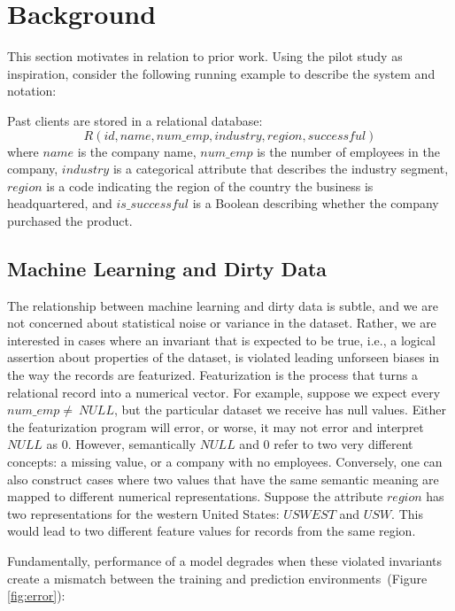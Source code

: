 \section{Background}
This section motivates \sys in relation to prior work.
Using the pilot study as inspiration, consider the following running example to describe the system and notation:

\begin{example}\sloppy\label{ex:lead}
 Past clients are stored in a relational database:
\[
R(id, name, num\_emp, industry, region, successful)
\]
where $name$ is the company name, $num\_emp$ is the number of employees in the company, $industry$ is a categorical attribute that describes the industry segment, $region$ is a code indicating the region of the country the business is headquartered, and $is\_successful$ is a Boolean describing whether the company purchased the product.
\end{example}

\subsection{Machine Learning and Dirty Data}
The relationship between machine learning and dirty data is subtle, and we are not concerned about statistical noise or variance in the dataset.
Rather, we are interested in cases where an invariant that is expected to be true, i.e., a logical assertion about properties of the dataset, is violated leading unforseen biases in the way the records are featurized.
Featurization is the process that turns a relational record into a numerical vector.
For example, suppose we expect every $num\_emp \ne~NULL$, but the particular dataset we receive has null values.
Either the featurization program will error, or worse, it may not error and interpret $NULL$ as $0$.
However, semantically $NULL$ and $0$ refer to two very different concepts: a missing value, or a company with no employees.
Conversely, one can also construct cases where two values that have the same semantic meaning are mapped to different numerical representations.
Suppose the attribute $region$ has two representations for the western United States: $USWEST$ and $USW$. 
This would lead to two different feature values for records from the same region.

Fundamentally, performance of a model degrades when these violated invariants create a mismatch between the training and prediction environments~(Figure \ref{fig:error}):

